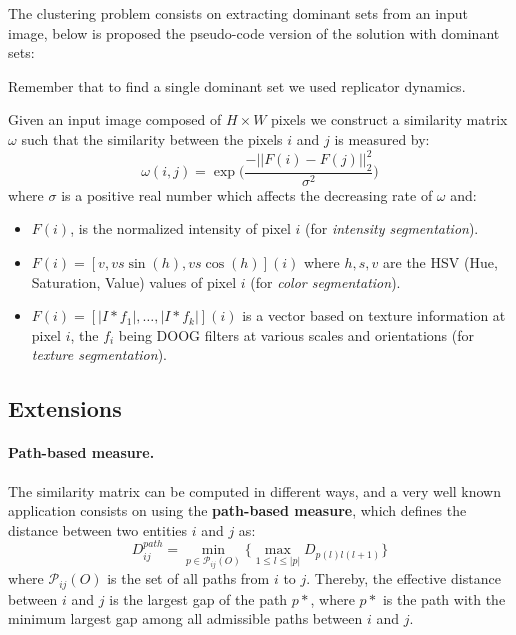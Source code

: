 The clustering problem consists on extracting dominant sets from an input image, below is proposed the pseudo-code version of the solution with dominant sets:

Remember that to find a single dominant set we used replicator dynamics.

Given an input image composed of $H \times W$ pixels we construct a similarity matrix $\omega$ such that the similarity between the pixels $i$ and $j$ is measured by:
$$\omega(i,j) = \exp\Big(\frac{-||F(i)- F(j)||^2_2}{\sigma^2}\Big)$$
where $\sigma$ is a positive real number which affects the decreasing rate of $\omega$ and:
\begin{itemize}
	\item $F(i)$, is the normalized intensity of pixel $i$ (for \textit{intensity segmentation}).
	\item $F(i) = [v, vs\sin(h), vs\cos(h)](i)$ where $h,s,v$ are the HSV (Hue, Saturation, Value) values of pixel $i$ (for \textit{color segmentation}).
	\item $F(i) = [|I*f_1|, \dots, |I*f_k|](i)$ is a vector based on texture information at pixel $i$, the $f_i$ being DOOG filters at various scales and orientations (for \textit{texture segmentation}).
\end{itemize}

\subsection{Extensions}
\paragraph{Path-based measure.} The similarity matrix can be computed in different ways, and a very well known application consists on using the \textbf{path-based measure}, which defines the distance between two entities $i$ and $j$ as:
$$D_{ij}^{path} = \min\limits_{p\in\mathcal{P}_{ij}(O)}\Big\{\max\limits_{1\leq l \leq |p|}D_{p(l)l(l+1)}\Big\}$$
where $\mathcal{P}_{ij}(O)$ is the set of all paths from $i$ to $j$. Thereby, the effective distance between $i$ and $j$ is the largest gap of the path $p*$, where $p*$ is the path with the minimum largest gap among all admissible paths between $i$ and $j$.

